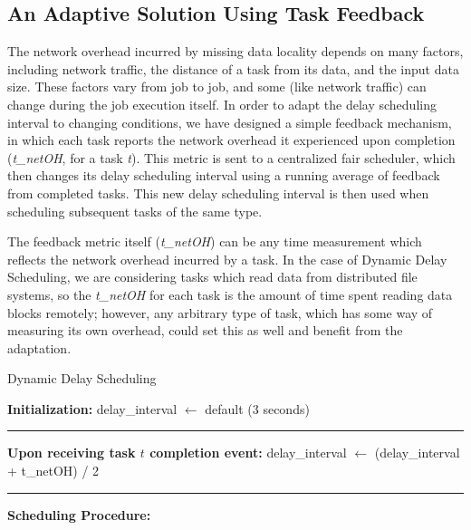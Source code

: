 \subsection{An Adaptive Solution Using Task Feedback}

The network overhead incurred by missing data locality depends on many factors, including 
network traffic, the distance of a task from its data, and the input data size. These 
factors vary from job to job, and some (like network traffic) can change during the job 
execution itself. In order to adapt the delay scheduling interval to changing conditions, 
we have designed a simple feedback mechanism, in which each task reports the network overhead it experienced 
upon completion (\textit{t\_netOH}, for a task \textit{t}). This metric is sent to a 
centralized fair scheduler, which then changes its delay scheduling interval using a 
running average of feedback from completed tasks. This new delay scheduling interval is 
then used when scheduling subsequent tasks of the same type.

The feedback metric itself (\textit{t\_netOH}) can be any time measurement which 
reflects the network overhead incurred by a task. In the case of Dynamic Delay Scheduling, we are 
considering tasks which read data from distributed file systems,
so the \textit{t\_netOH} for each task is the amount of time spent 
reading data blocks remotely; however, any arbitrary type of task, which has some way of 
measuring its own overhead, could set this as well and benefit from the adaptation.


\begin{algorithm}[]
    \footnotesize
    \DontPrintSemicolon
    \caption{Dynamic Delay Scheduling}
    \textbf{Initialization:}\;
    delay\_interval $\leftarrow$ default (3 seconds)\;
    \hrule width 0.4\textwidth
    \;
    \textbf{Upon receiving task $t$ completion event:}\;
    delay\_interval $\leftarrow$ (delay\_interval + t\_netOH) / 2\;
    \hrule width 0.4\textwidth
    \;
    \textbf{Scheduling Procedure:}\;
\end{algorithm}


